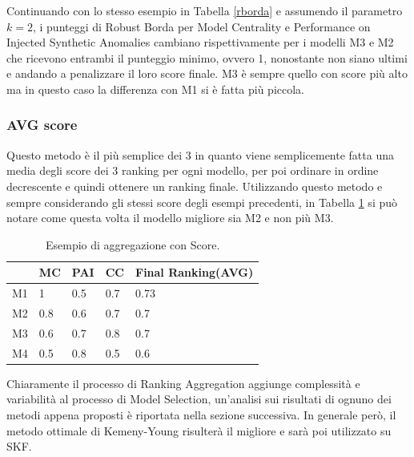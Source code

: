 Continuando con lo stesso esempio in Tabella \ref{rborda} e assumendo il parametro \(k=2\), i punteggi di Robust Borda per Model Centrality e Performance on Injected Synthetic Anomalies cambiano rispettivamente per i modelli M3 e M2 che ricevono entrambi il punteggio minimo, ovvero 1, nonostante non siano ultimi e andando a penalizzare il loro score finale. M3 è sempre quello con score più alto ma in questo caso la differenza con M1 si è fatta più piccola.

\subsubsection{AVG score}
Questo metodo è il più semplice dei 3 in quanto viene semplicemente fatta una media degli score dei 3 ranking per ogni modello, per poi ordinare in ordine decrescente e quindi ottenere un ranking finale.
Utilizzando questo metodo e sempre considerando gli stessi score degli esempi precedenti, in Tabella \ref{score} si può notare come questa volta il modello migliore sia M2 e non più M3.

\begin{table}
	
	\centering
	\begin{tabular}{|l|l|l|l|l|}
		\hline
		   & MC  & PAI & CC  & Final Ranking(AVG) \\ \hline
		M1 & 1   & 0.5 & 0.7 & 0.73               \\ \hline
		M2 & 0.8 & 0.6 & 0.7 & 0.7                \\ \hline
		M3 & 0.6 & 0.7 & 0.8 & 0.7                \\ \hline
		M4 & 0.5 & 0.8 & 0.5 & 0.6                \\ \hline
	\end{tabular}
	\caption{\label{score}Esempio di aggregazione con Score.}
\end{table}


Chiaramente il processo di Ranking Aggregation aggiunge complessità e variabilità al processo di Model Selection, un'analisi sui risultati di ognuno dei metodi appena proposti è riportata nella sezione successiva. In generale però, il metodo ottimale di Kemeny-Young risulterà il migliore e sarà poi utilizzato su SKF.


